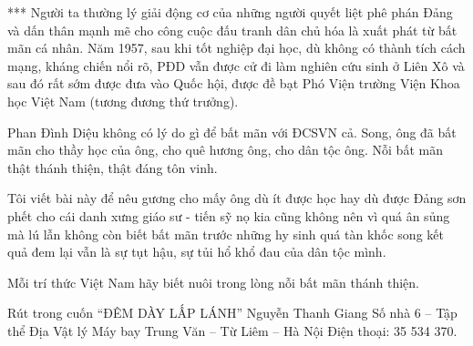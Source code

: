 *** Người ta thường lý giải động cơ của những người quyết liệt phê phán Đảng và dấn thân mạnh mẽ cho công cuộc đấu tranh dân chủ hóa là xuất phát từ bất mãn cá nhân. Năm 1957, sau khi tốt nghiệp đại học, dù không có thành tích cách mạng, kháng chiến nổi rõ, PĐD vẫn được cử đi làm nghiên cứu sinh ở Liên Xô và sau đó rất sớm được đưa vào Quốc hội, được đề bạt Phó Viện trường Viện Khoa học Việt Nam (tương đương thứ trưởng). 

Phan Đình Diệu không có lý do gì để bất mãn với ĐCSVN cả. Song, ông đã bất mãn cho thầy học của ông, cho quê hương ông, cho dân tộc ông. Nỗi bất mãn thật thánh thiện, thật đáng tôn vinh.

Tôi viết bài này để nêu gương cho mấy ông dù ít được học hay dù được Đảng sơn phết cho cái danh xưng giáo sư - tiến sỹ nọ kia cũng không nên vì quá ân sủng mà lú lẫn không còn biết bất mãn trước những hy sinh quá tàn khốc song kết quả đem lại vẫn là sự tụt hậu, sự tủi hổ khổ đau của dân tộc mình.

Mỗi trí thức Việt Nam hãy biết nuôi trong lòng nỗi bất mãn thánh thiện.

Rút trong cuốn “ĐÊM DÀY LẤP LÁNH”
Nguyễn Thanh Giang
Số nhà 6 – Tập thể Địa Vật lý Máy bay
Trung Văn – Từ Liêm – Hà Nội
Điện thoại: 35 534 370.